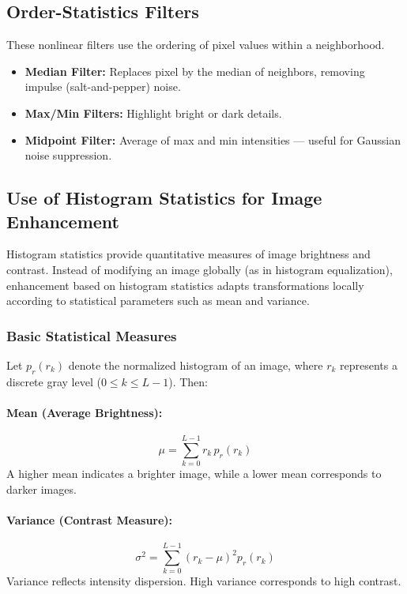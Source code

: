 \documentclass[12pt,a4paper]{AnantDocumentation}
\begin{document}
\subsection{Order-Statistics Filters}
These nonlinear filters use the ordering of pixel values within a neighborhood.
\begin{itemize}
\item \textbf{Median Filter:} Replaces pixel by the median of neighbors, removing impulse (salt-and-pepper) noise.
\item \textbf{Max/Min Filters:} Highlight bright or dark details.
\item \textbf{Midpoint Filter:} Average of max and min intensities — useful for Gaussian noise suppression.
\end{itemize}
\subsection{Use of Histogram Statistics for Image Enhancement}

Histogram statistics provide quantitative measures of image brightness and contrast.  
Instead of modifying an image globally (as in histogram equalization), enhancement based on histogram statistics adapts transformations locally according to statistical parameters such as mean and variance.

\subsubsection{Basic Statistical Measures}

Let $p_r(r_k)$ denote the normalized histogram of an image, where $r_k$ represents a discrete gray level ($0 \le k \le L-1$).  
Then:

\paragraph{Mean (Average Brightness):}
\begin{equation}
\mu = \sum_{k=0}^{L-1} r_k \, p_r(r_k)
\end{equation}
A higher mean indicates a brighter image, while a lower mean corresponds to darker images.

\paragraph{Variance (Contrast Measure):}
\begin{equation}
\sigma^2 = \sum_{k=0}^{L-1} (r_k - \mu)^2 p_r(r_k)
\end{equation}
Variance reflects intensity dispersion. High variance corresponds to high contrast.
\end{document}
